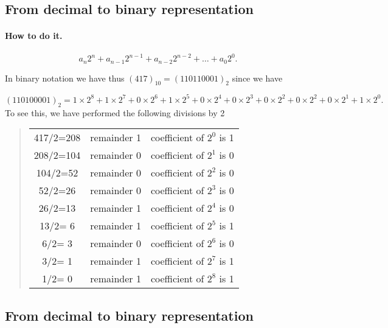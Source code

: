 \documentclass[%
twoside,                 %
final,                   %
10pt]{article}
\newenvironment{paragraphadmon}[1][]{\paragraph{#1}}{}
\begin{document}
\subsection{From decimal to binary representation}


\begin{paragraphadmon}[How to do it.]
\[
  a_n2^n+a_{n-1}2^{n-1}  +a_{n-2}2^{n-2}  +\dots +a_{0}2^{0}.
\]

In binary notation we have thus $(417)_{10} =(110110001)_2$
since we have

\[
(110100001)_2
=1\times2^8+1\times 2^{7}+0\times 2^{6}+1\times 2^{5}+0\times 2^{4}+0\times 2^{3}+0\times 2^{2}+0\times 2^{2}+0\times 2^{1}+1\times 2^{0}.
\]
To see this, we have performed the following divisions by 2




\begin{quote}
\begin{tabular}{ccc}
\hline
 \\
\hline
417/2=208                   & remainder 1                 & coefficient of $2^{0}$ is 1 \\
208/2=104                   & remainder 0                 & coefficient of $2^{1}$ is 0 \\
104/2=52                    & remainder 0                 & coefficient of $2^{2}$ is 0 \\
52/2=26                     & remainder 0                 & coefficient of $2^{3}$ is 0 \\
26/2=13                     & remainder 1                 & coefficient of $2^{4}$ is 0 \\
13/2= 6                     & remainder 1                 & coefficient of $2^{5}$ is 1 \\
6/2= 3                      & remainder 0                 & coefficient of $2^{6}$ is 0 \\
3/2= 1                      & remainder 1                 & coefficient of $2^{7}$ is 1 \\
1/2= 0                      & remainder 1                 & coefficient of $2^{8}$ is 1 \\
\hline
\end{tabular}
\end{quote}

\noindent
\end{paragraphadmon}



\subsection{From decimal to binary representation}
\end{document}
